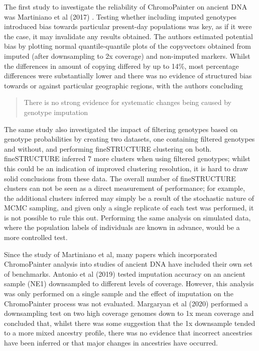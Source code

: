 The first study to investigate the reliability of ChromoPainter on ancient DNA was Martiniano et al (2017) \cite{Martiniano2017}. Testing whether including imputed genotypes introduced bias towards particular present-day populations was key, as if it were the case, it may invalidate any results obtained. The authors estimated potential bias by plotting normal quantile-quantile plots of the copyvectors obtained from imputed (after downsampling to 2x coverage) and non-imputed markers. Whilst the differences in amount of copying differed by up to 14\%, most percentage differences were substantially lower and there was no evidence of structured bias towards or against particular geographic regions, with the authors concluding \blockquote{There is no strong evidence for systematic changes being caused by genotype imputation}.


The same study also investigated the impact of filtering genotypes based on genotype probabilities by creating two datasets, one containing filtered genotypes and without, and performing fineSTRUCTURE clustering on both. fineSTRUCTURE inferred 7 more clusters when using filtered genotypes; whilst this could be an indication of improved clustering resolution, it is hard to draw solid conclusions from these data. The overall number of fineSTRUCTURE clusters can not be seen as a direct measurement of performance; for example, the additional clusters inferred may simply be a result of the stochastic nature of MCMC sampling, and given only a single replicate of each test was performed, it is not possible to rule this out. Performing the same analysis on simulated data, where the population labels of individuals are known in advance, would be a more controlled test. 

Since the study of Martiniano et al, many papers which incorporated ChromoPainter analysis into studies of ancient DNA have included their own set of benchmarks. Antonio et al (2019) \cite{antonio2019ancient} tested imputation accuracy on an ancient sample (NE1) downsampled to different levels of coverage. However, this analysis was only performed on a single sample and the effect of imputation on the ChromoPainter process was not evaluated. Margaryan et al (2020) performed a downsampling test on two high coverage genomes down to 1x mean coverage and concluded that, whilst there was some suggestion that the 1x downsample tended to a more mixed ancestry profile, there was no evidence that incorrect ancestries have been inferred or that major changes in ancestries have occurred. 

